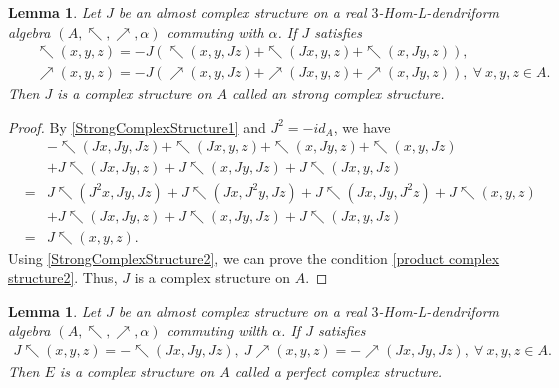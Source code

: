\documentclass[a4paper,11pt]{article}
\def\a{\alpha}
\def\nw{\nwarrow}
\def\ne{\nearrow}
\newtheorem{lem}[thm]{Lemma}
\theoremstyle{definition}
\begin{document}
 \begin{lem}Let $J$ be an almost complex structure on a real $3$-Hom-L-dendriform algebra $(A,\nw,\ne,\alpha)$ commuting with $\a$. If $J$ satisfies
     \begin{eqnarray}\label{StrongComplexStructure1}
&&\nw(x,y,z)=-J(\nw(x,y,Jz)+\nw(Jx,y,z)+\nw(x,Jy,z)),\\\label{StrongComplexStructure2}&&\ne(x,y,z)=-J(\ne(x,y,Jz)+\ne(Jx,y,z)+\ne(x,Jy,z)),\ \forall \ x,y,z\in A.
\end{eqnarray}
Then $J$ is a complex structure on $A$ called an strong  complex structure.
\end{lem}
\begin{proof}
  By \eqref{StrongComplexStructure1} and $J^2=-id_A$, we have
\begin{eqnarray*}
&&-\nw(Jx,Jy,Jz)+\nw(Jx,y,z)+\nw(x,Jy,z)+\nw(x,y,Jz)\\
&&+J\nw(Jx,Jy,z)+J\nw(x,Jy,Jz)+J\nw(Jx,y,Jz)\\
&=&J\nw(J^2x,Jy,Jz)+J\nw(Jx,J^2y,Jz)+J\nw(Jx,Jy,J^2z)+J\nw(x,y,z)\\
&&+J\nw(Jx,Jy,z)+J\nw(x,Jy,Jz)+J\nw(Jx,y,Jz)\\
&=&J\nw(x,y,z).
\end{eqnarray*}
Using  \eqref{StrongComplexStructure2}, we can prove the condition \eqref{product complex structure2}.
Thus, $J$ is a complex structure on $A$.
\end{proof}
\begin{lem} Let $J$ be an almost complex structure on a real $3$-Hom-L-dendriform algebra $(A,\nw,\ne,\alpha)$ commuting wilth $\a$. If $J$ satisfies
     \begin{eqnarray}\label{PerfectComplexStructure}
J\nw(x,y,z)=-\nw(Jx,Jy,Jz),\ J\ne(x,y,z)=-\ne(Jx,Jy,Jz),\ \forall \ x,y,z\in A.
\end{eqnarray}
Then $E$ is a complex structure on $A$ called a perfect complex structure.
   \end{lem}
\end{document}

